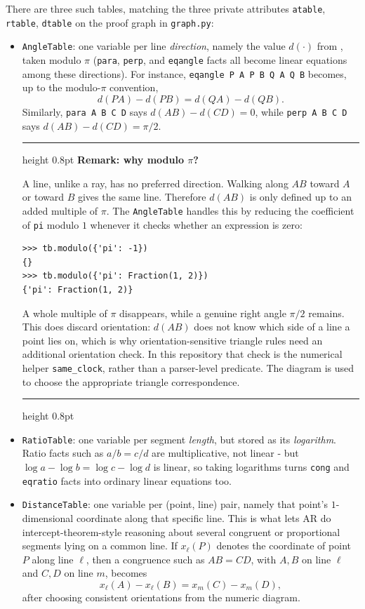 \documentclass[reqno]{amsart}
\newenvironment{lecturebox}[1]{%
    \par\medskip
    \noindent\begingroup
    \setlength{\parindent}{0pt}
    \color{agblue}\hrule height 0.8pt\color{black}
    \smallskip
    \textbf{\color{agblue}#1}\par\smallskip
}{%
    \smallskip
    \color{agblue}\hrule height 0.8pt\color{black}
    \endgroup
    \medskip
}
\DeclareMathOperator{\1}{\textbf{1}}
\begin{document}
There are three such tables, matching the three private attributes
\verb|atable|, \verb|rtable|, \verb|dtable| on the proof graph in
\verb|graph.py|:

\begin{itemize}
    \item \verb|AngleTable|: one variable per line \emph{direction}, namely
          the value $d(\cdot)$ from , taken modulo $\pi$
          (\verb|para|, \verb|perp|, and \verb|eqangle| facts all become
          linear equations among these directions). For instance,
          \verb|eqangle P A P B Q A Q B| becomes, up to the modulo-$\pi$
          convention,
          \[
          d(PA)-d(PB)=d(QA)-d(QB).
          \]
          Similarly, \verb|para A B C D| says \(d(AB)-d(CD)=0\), while
          \verb|perp A B C D| says \(d(AB)-d(CD)=\pi/2\).

          \begin{lecturebox}{Remark: why modulo \(\pi\)?}
          A line, unlike a ray, has no preferred direction. Walking along
          \(AB\) toward \(A\) or toward \(B\) gives the same line. Therefore
          \(d(AB)\) is only defined up to an added multiple of \(\pi\). The
          \verb|AngleTable| handles this by reducing the coefficient of
          \verb|pi| modulo \(1\) whenever it checks whether an expression is
          zero:
          \begin{lstlisting}
>>> tb.modulo({'pi': -1})
{}
>>> tb.modulo({'pi': Fraction(1, 2)})
{'pi': Fraction(1, 2)}
\end{lstlisting}
          A whole multiple of \(\pi\) disappears, while a genuine right angle
          \(\pi/2\) remains. This does discard orientation: \(d(AB)\) does
          not know which side of a line a point lies on, which is why
          orientation-sensitive triangle rules need an additional orientation
          check. In this repository that check is the numerical helper
          \verb|same_clock|, rather than a parser-level predicate. The diagram
          is used to choose the appropriate triangle correspondence.
          \end{lecturebox}
    \item \verb|RatioTable|: one variable per segment \emph{length}, but
          stored as its \emph{logarithm}. Ratio facts such as
          $a/b = c/d$ are multiplicative, not linear - but
          $\log a - \log b = \log c - \log d$ is linear, so taking logarithms
          turns \verb|cong| and \verb|eqratio| facts into ordinary linear
          equations too.
    \item \verb|DistanceTable|: one variable per (point, line) pair, namely
          that point's $1$-dimensional coordinate along that specific line.
          This is what lets AR do intercept-theorem-style reasoning about
          several congruent or proportional segments lying on a common line.
          If \(x_\ell(P)\) denotes the coordinate of point \(P\) along line
          \(\ell\), then a congruence such as \(AB=CD\), with \(A,B\) on
          line \(\ell\) and \(C,D\) on line \(m\), becomes
          \[
          x_\ell(A)-x_\ell(B)=x_m(C)-x_m(D),
          \]
          after choosing consistent orientations from the numeric diagram.
\end{itemize}
\end{document}

